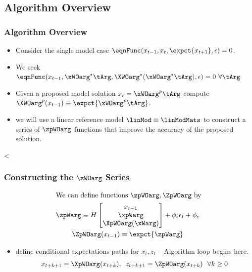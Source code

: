 \documentclass[notheorems]{beamer}
\begin{document}
\subsection{Algorithm Overview}
\label{sec:pseudocode}
\begin{frame}
  \frametitle{Algorithm Overview}
{\small
  \begin{itemize}
  \item Consider the single model case $  \eqnFunc(x_{t-1},x_t,\expct{x_{t+1}},\epsilon)=0$.  
\item We seek $\eqnFunc(x_{t-1},\xWOarg^\star\tArg,\XWOarg^\star(\xWOarg^\star\tArg),\epsilon)=0\,\,\forall \tArg $
\item Given a proposed model solution $x_t=\xWOarg^p\tArg$ compute $\XWOarg^p(x_{t-1})\equiv \expct{\xWOarg^p\tArg}$. 
\item we will use a linear reference model $\linMod  \equiv \linModMats$ 
to construct a series of $\zpWOarg$ functions that improve the accuracy of the proposed solution.
\end{itemize}<
}
\end{frame}
\begin{frame}
  \frametitle{Constructing the $\zWOarg$ Series}

\begin{gather*}
 \intertext{We can define functions $\zpWOarg,\ZpWOarg$ by}
\zpWarg\equiv H
\begin{bmatrix}
x_{t-1}\\ \xpWarg\\ \XpWOarg(\xWarg)
\end{bmatrix}+\phi_\epsilon \epsilon_t+\phi_c\\
\ZpWOarg(x_{t-1})\equiv \expct{\zpWarg}
\end{gather*}
 \begin{itemize}
\item  define conditional expectations paths for $x_t, z_t$ -- {\color{green} Algorithm loop begins here.}
 \begin{gather*}
 x_{t+k+1}=\XpWOarg(x_{t+k}),\,\,\,z_{t+k+1}=\ZpWOarg(x_{t+k})\,\,\,\,  \forall k\ge 0      \end{gather*}
   \end{itemize}

\end{frame}
\end{document}
